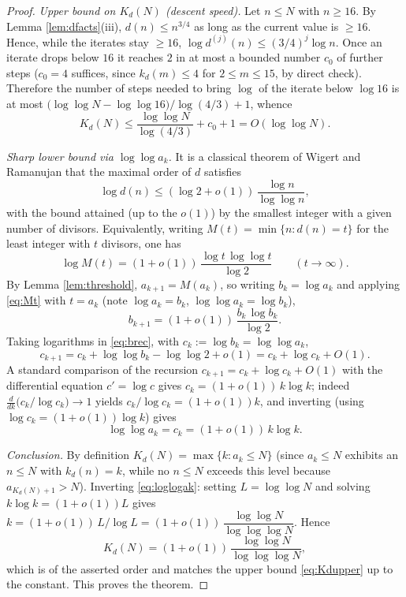 \documentclass{amsart}
\theoremstyle{definition}
\begin{document}
\begin{proof}
\emph{Upper bound on $K_d(N)$ (descent speed).} Let $n\le N$ with $n\ge16$.
By Lemma \ref{lem:dfacts}(iii), $d(n)\le n^{3/4}$ as long as the current value
is $\ge 16$. Hence, while the iterates stay $\ge16$,
$\log d^{(j)}(n)\le (3/4)^{j}\log n$. Once an iterate drops below $16$ it
reaches $2$ in at most a bounded number $c_0$ of further steps
($c_0=4$ suffices, since $k_d(m)\le4$ for $2\le m\le15$, by direct check).
Therefore the number of steps needed to bring $\log$ of the iterate below
$\log16$ is at most
$\bigl(\log\log N-\log\log16\bigr)/\log(4/3)+1$, whence
\begin{equation}\label{eq:Kdupper}
K_d(N)\le \frac{\log\log N}{\log(4/3)}+c_0+1 = O(\log\log N).
\end{equation}

\emph{Sharp lower bound via $\log\log a_k$.} It is a classical theorem of
Wigert and Ramanujan that the maximal order of $d$ satisfies
\[
\log d(n)\le(\log 2+o(1))\,\frac{\log n}{\log\log n},
\]
with the bound attained (up to the $o(1)$) by the smallest integer with a given
number of divisors. Equivalently, writing $M(t)=\min\{n:d(n)=t\}$ for the least
integer with $t$ divisors, one has
\begin{equation}\label{eq:Mt}
\log M(t)=(1+o(1))\,\frac{\log t\,\log\log t}{\log 2}\qquad(t\to\infty).
\end{equation}
By Lemma \ref{lem:threshold}, $a_{k+1}=M(a_k)$, so writing $b_k=\log a_k$ and
applying \eqref{eq:Mt} with $t=a_k$ (note $\log a_k=b_k$, $\log\log a_k=\log b_k$),
\begin{equation}\label{eq:brec}
b_{k+1}=(1+o(1))\,\frac{b_k\,\log b_k}{\log 2}.
\end{equation}
Taking logarithms in \eqref{eq:brec}, with $c_k:=\log b_k=\log\log a_k$,
\[
c_{k+1}=c_k+\log\log b_k-\log\log 2+o(1)
       =c_k+\log c_k+O(1).
\]
A standard comparison of the recursion $c_{k+1}=c_k+\log c_k+O(1)$ with the
differential equation $c'=\log c$ gives $c_k=(1+o(1))\,k\log k$; indeed
$\frac{d}{dk}\bigl(c_k/\log c_k\bigr)\to1$ yields $c_k/\log c_k=(1+o(1))k$,
and inverting (using $\log c_k=(1+o(1))\log k$) gives
\begin{equation}\label{eq:loglogak}
\log\log a_k=c_k=(1+o(1))\,k\log k .
\end{equation}

\emph{Conclusion.} By definition $K_d(N)=\max\{k:a_k\le N\}$ (since
$a_k\le N$ exhibits an $n\le N$ with $k_d(n)=k$, while no $n\le N$ exceeds this
level because $a_{K_d(N)+1}>N$). Inverting \eqref{eq:loglogak}: setting
$L=\log\log N$ and solving $k\log k=(1+o(1))L$ gives
$k=(1+o(1))\,L/\log L=(1+o(1))\,\dfrac{\log\log N}{\log\log\log N}$. Hence
\[
K_d(N)=(1+o(1))\,\frac{\log\log N}{\log\log\log N},
\]
which is of the asserted order and matches the upper bound
\eqref{eq:Kdupper} up to the constant. This proves the theorem.
\end{proof}
\end{document}
